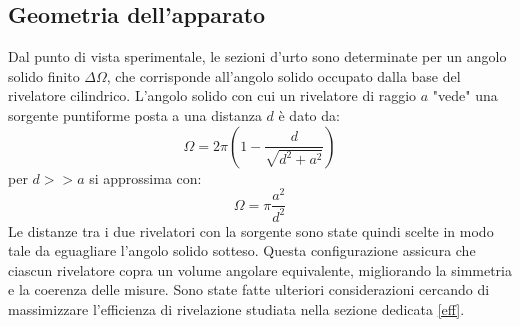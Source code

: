 \subsection{Geometria dell'apparato}
 Dal punto di vista sperimentale, le sezioni d'urto sono determinate per un angolo solido finito $\Delta \Omega$, che corrisponde all'angolo solido occupato dalla base del rivelatore cilindrico. L'angolo solido con cui un rivelatore di raggio $a$ "vede" una sorgente puntiforme posta a una distanza $d$ è dato da:
\begin{equation}
    \Omega=2\pi\left(1-\frac{d}{\sqrt{d^2+a^2}}\right)
\end{equation}
per $d>>a$ si approssima con:
\begin{equation}
    \Omega=\pi\frac{a^2}{d^2}
    \label{eq:angolo_solido}
\end{equation}
Le distanze tra i due rivelatori con la sorgente sono state quindi scelte in modo tale da eguagliare l'angolo solido sotteso. Questa configurazione assicura che ciascun rivelatore copra un volume angolare equivalente, migliorando la simmetria e la coerenza delle misure. Sono state fatte ulteriori considerazioni cercando di massimizzare l'efficienza di rivelazione studiata nella sezione dedicata \ref{eff}.
